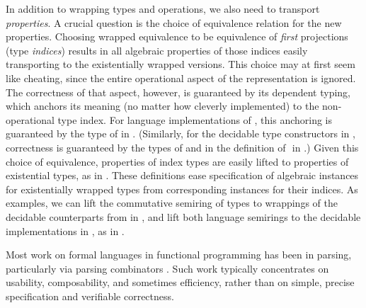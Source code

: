 \documentclass[acmsmall,screen,anonymous,timestamp]{acmart}
\begin{document}
In addition to wrapping types and operations, we also need to transport \emph{properties}.
A crucial question is the choice of equivalence relation for the new properties.
Choosing wrapped equivalence to be equivalence of \emph{first} projections (type \emph{indices}) results in all algebraic properties of those indices easily transporting to the existentially wrapped versions.
This choice may at first seem like cheating, since the entire operational aspect of the representation is ignored.
The correctness of that aspect, however, is guaranteed by its dependent typing, which anchors its meaning (no matter how cleverly implemented) to the non-operational type index.
For language implementations of , this anchoring is guaranteed by the type of  in .
(Similarly, for the decidable type constructors in , correctness is guaranteed by the types of  and  in the definition of ‌ in .)
Given this choice of equivalence, properties of index types are easily lifted to properties of existential types, as in .
These definitions ease specification of algebraic instances for existentially wrapped types from corresponding instances for their indices.
\rnc{}
As examples, we can lift the commutative semiring of types to wrappings of the decidable counterparts from  in , and lift both language semirings to the decidable implementations in , as in .



Most work on formal languages in functional programming has been in parsing, particularly via parsing combinators \needcite{}.
Such work typically concentrates on usability, composability, and sometimes efficiency, rather than on simple, precise specification and verifiable correctness.
\end{document}
